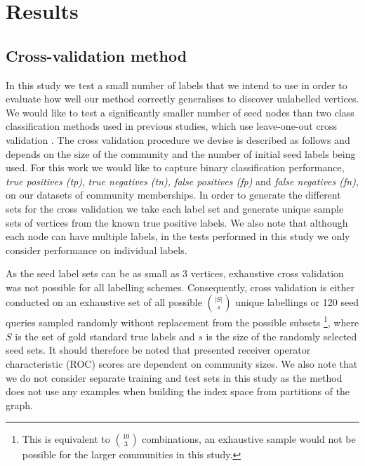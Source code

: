 \documentclass[sigconf]{acmart}
\begin{document}
\section{Results}
\subsection{Cross-validation method}
\label{sec:cross_validation}
In this study we test a small number of labels that we intend to use in order to evaluate how well our method correctly generalises to discover unlabelled vertices.
We would like to test a significantly smaller number of seed nodes than two class classification methods used in previous studies, which use leave-one-out cross validation \cite{kohler2008walking}.
The cross validation procedure we devise is described as follows and depends on the size of the community and the number of initial seed labels being used.
For this work we would like to capture binary classification  performance, \textit{true positives (tp)}, \textit{true negatives (tn), false positives (fp)} and \textit{false negatives (fn)}, on our datasets of community memberships.
In order to generate the different sets for the cross validation we take each label set and generate unique sample sets of vertices from the known true positive labels.
We also note that although each node can have multiple labels, in the tests performed in this study we only consider performance on individual labels.

As the seed label sets can be as small as 3 vertices, exhaustive cross validation was not possible for all labelling schemes.
Consequently, cross validation is either conducted on an exhaustive set of all possible $\binom{|S|}{s}$ unique labellings or 120 seed queries sampled randomly without replacement from the possible subsets \footnote{This is equivalent to $\binom{10}{3}$ combinations, an exhaustive sample would not be possible for the larger communities in this study.}, where $S$ is the set of gold standard true labels and $s$ is the size of the randomly selected seed sets.
It should therefore be noted that presented receiver operator characteristic (ROC) scores are dependent on community sizes.
We also note that we do not consider separate training and test sets in this study as the method does not use any examples when building the index space from partitions of the graph.
\end{document}
